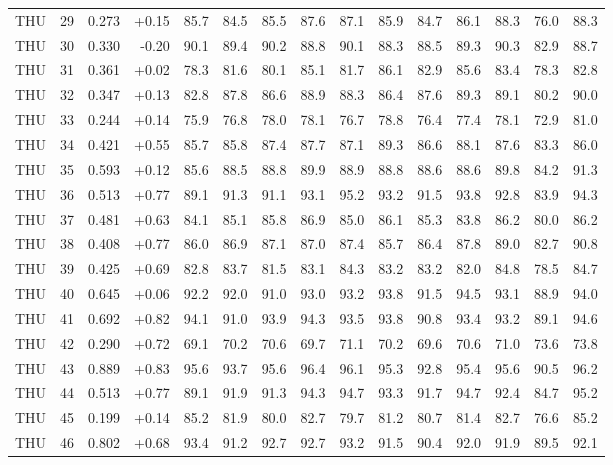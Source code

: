 \begin{longtable}{@{}llrrrrrrrrrrrrr@{}}
THU & 29 & 0.273 & +0.15 & 85.7 & 84.5 & 85.5 & 87.6 & 87.1 & 85.9 & 84.7 & 86.1 & 88.3 & 76.0 & 88.3 \\
THU & 30 & 0.330 & -0.20 & 90.1 & 89.4 & 90.2 & 88.8 & 90.1 & 88.3 & 88.5 & 89.3 & 90.3 & 82.9 & 88.7 \\
THU & 31 & 0.361 & +0.02 & 78.3 & 81.6 & 80.1 & 85.1 & 81.7 & 86.1 & 82.9 & 85.6 & 83.4 & 78.3 & 82.8 \\
THU & 32 & 0.347 & +0.13 & 82.8 & 87.8 & 86.6 & 88.9 & 88.3 & 86.4 & 87.6 & 89.3 & 89.1 & 80.2 & 90.0 \\
THU & 33 & 0.244 & +0.14 & 75.9 & 76.8 & 78.0 & 78.1 & 76.7 & 78.8 & 76.4 & 77.4 & 78.1 & 72.9 & 81.0 \\
THU & 34 & 0.421 & +0.55 & 85.7 & 85.8 & 87.4 & 87.7 & 87.1 & 89.3 & 86.6 & 88.1 & 87.6 & 83.3 & 86.0 \\
THU & 35 & 0.593 & +0.12 & 85.6 & 88.5 & 88.8 & 89.9 & 88.9 & 88.8 & 88.6 & 88.6 & 89.8 & 84.2 & 91.3 \\
THU & 36 & 0.513 & +0.77 & 89.1 & 91.3 & 91.1 & 93.1 & 95.2 & 93.2 & 91.5 & 93.8 & 92.8 & 83.9 & 94.3 \\
THU & 37 & 0.481 & +0.63 & 84.1 & 85.1 & 85.8 & 86.9 & 85.0 & 86.1 & 85.3 & 83.8 & 86.2 & 80.0 & 86.2 \\
THU & 38 & 0.408 & +0.77 & 86.0 & 86.9 & 87.1 & 87.0 & 87.4 & 85.7 & 86.4 & 87.8 & 89.0 & 82.7 & 90.8 \\
THU & 39 & 0.425 & +0.69 & 82.8 & 83.7 & 81.5 & 83.1 & 84.3 & 83.2 & 83.2 & 82.0 & 84.8 & 78.5 & 84.7 \\
THU & 40 & 0.645 & +0.06 & 92.2 & 92.0 & 91.0 & 93.0 & 93.2 & 93.8 & 91.5 & 94.5 & 93.1 & 88.9 & 94.0 \\
THU & 41 & 0.692 & +0.82 & 94.1 & 91.0 & 93.9 & 94.3 & 93.5 & 93.8 & 90.8 & 93.4 & 93.2 & 89.1 & 94.6 \\
THU & 42 & 0.290 & +0.72 & 69.1 & 70.2 & 70.6 & 69.7 & 71.1 & 70.2 & 69.6 & 70.6 & 71.0 & 73.6 & 73.8 \\
THU & 43 & 0.889 & +0.83 & 95.6 & 93.7 & 95.6 & 96.4 & 96.1 & 95.3 & 92.8 & 95.4 & 95.6 & 90.5 & 96.2 \\
THU & 44 & 0.513 & +0.77 & 89.1 & 91.9 & 91.3 & 94.3 & 94.7 & 93.3 & 91.7 & 94.7 & 92.4 & 84.7 & 95.2 \\
THU & 45 & 0.199 & +0.14 & 85.2 & 81.9 & 80.0 & 82.7 & 79.7 & 81.2 & 80.7 & 81.4 & 82.7 & 76.6 & 85.2 \\
THU & 46 & 0.802 & +0.68 & 93.4 & 91.2 & 92.7 & 92.7 & 93.2 & 91.5 & 90.4 & 92.0 & 91.9 & 89.5 & 92.1 \\

\end{longtable}
